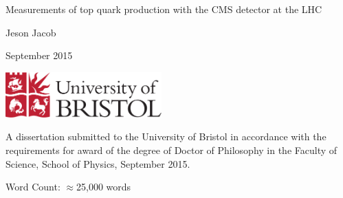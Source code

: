 \begin{titlepage}
	
	\begin{center}
		
		\vspace*{1cm}
		
		\Huge
		
		Measurements of top quark production with the CMS detector at the LHC

		\vspace{0.5cm}
		
		\large
		
		Jeson Jacob
		
		\vspace{0.5cm}
		
		September 2015 %
		
		\vspace{0.5cm}
		
		\includegraphics[width=60mm]{Images/UnivShield}
		
		\vfill
		
		\normalsize
	\end{center}
	A dissertation submitted to the University of Bristol in accordance with the
	requirements for award of the degree of Doctor of Philosophy in the Faculty of
	Science, School of Physics, September 2015.

	\begin{flushright}
		Word Count: $\approx$25,000 words
	\end{flushright}

\end{titlepage}